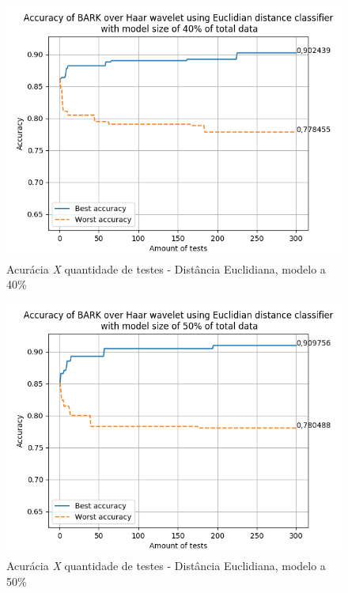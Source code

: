 \begin{myenv}{1.5}
		\newpage	
		\begin{figure}[h]
			\centering
			\includegraphics{images/results/confusionMatrices/classifier_Euclidian_40}
			\caption{Acurácia \textit{X} quantidade de testes - Distância Euclidiana, modelo a 40\%}
			\label{fig:classifiereuclidian40}
		\end{figure}
		
	
		\newpage
		\begin{figure}[h]
			\centering
			\includegraphics{images/results/confusionMatrices/classifier_Euclidian_50}
			\caption{Acurácia \textit{X} quantidade de testes - Distância Euclidiana, modelo a 50\%}
			\label{fig:classifiereuclidian50}
		\end{figure}
		
	

\end{myenv}
